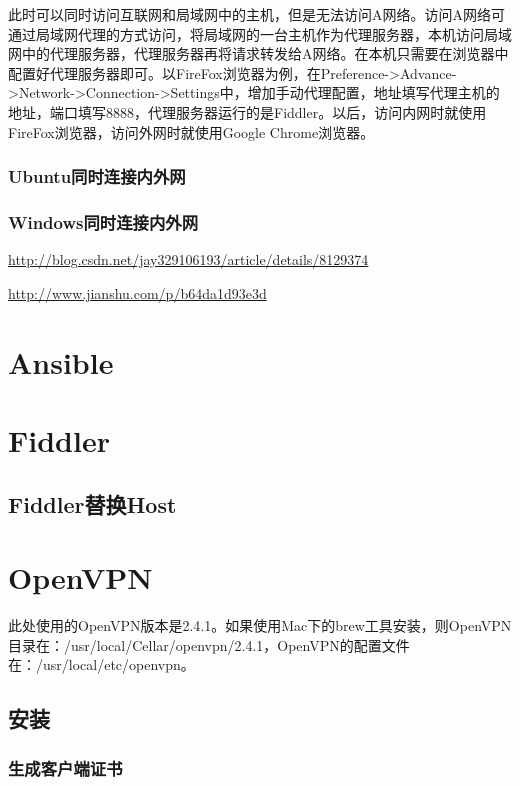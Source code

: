 \documentclass[letter]{book}
\begin{document}
此时可以同时访问互联网和局域网中的主机，但是无法访问A网络。访问A网络可通过局域网代理的方式访问，将局域网的一台主机作为代理服务器，本机访问局域网中的代理服务器，代理服务器再将请求转发给A网络。在本机只需要在浏览器中配置好代理服务器即可。以FireFox浏览器为例，在Preference->Advance->Network->Connection->Settings中，增加手动代理配置，地址填写代理主机的地址，端口填写8888，代理服务器运行的是Fiddler。以后，访问内网时就使用FireFox浏览器，访问外网时就使用Google Chrome浏览器。


\subsubsection{Ubuntu同时连接内外网}

\subsubsection{Windows同时连接内外网}

\url{http://blog.csdn.net/jay329106193/article/details/8129374}

\url{http://www.jianshu.com/p/b64da1d93e3d}



\section{Ansible}

\section{Fiddler}

\subsection{Fiddler替换Host}

\section{OpenVPN}

此处使用的OpenVPN版本是2.4.1。如果使用Mac下的brew工具安装，则OpenVPN目录在：/usr/local/Cellar/openvpn/2.4.1，OpenVPN的配置文件在：/usr/local/etc/openvpn。

\subsection{安装}

\subsubsection{生成客户端证书}
\end{document}
